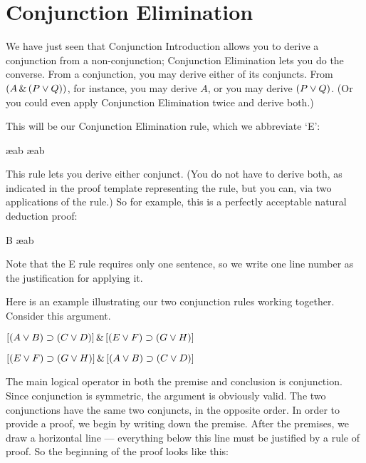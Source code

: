 \section{Conjunction Elimination}

We have just seen that Conjunction Introduction allows you to derive a conjunction from a non-conjunction; Conjunction Elimination lets you do the converse. From a conjunction, you may derive either of its conjuncts. From $(A \,\&\, (P \vee Q))$, for instance, you may derive $A$, or you may derive $(P \vee Q)$. (Or you could even apply Conjunction Elimination twice and derive both.)

This will be our Conjunction Elimination rule, which we abbreviate `{\eand}E':

\begin{ndproof}
	\metaA{} \ae{ab}
	\metaB{} \ae{ab}
\end{ndproof}

This rule lets you derive either conjunct. (You do not have to derive both, as indicated in the proof template representing the rule, but you can, via two applications of the rule.) So for example, this is a perfectly acceptable natural deduction proof:

\begin{ndproof}
	B \ae{ab}
\end{ndproof}

Note that the {\eand}E rule requires only one sentence, so we write one line number as the justification for applying it.

Here is an example illustrating our two conjunction rules working together. Consider this argument.
\begin{earg}
\item[] $[(A\vee B)\supset(C\vee D)] \,\&\, [(E \vee F) \supset (G\vee H)]$
\item[\therefore] $[(E \vee F) \supset (G\vee H)] \,\&\, [(A\vee B)\supset(C\vee D)]$
\end{earg}
The main logical operator in both the premise and conclusion is conjunction. Since conjunction is symmetric, the argument is obviously valid. The two conjunctions have the same two conjuncts, in the opposite order. In order to provide a proof, we begin by writing down the premise. After the premises, we draw a horizontal line --- everything below this line must be justified by a rule of proof. So the beginning of the proof looks like this:

